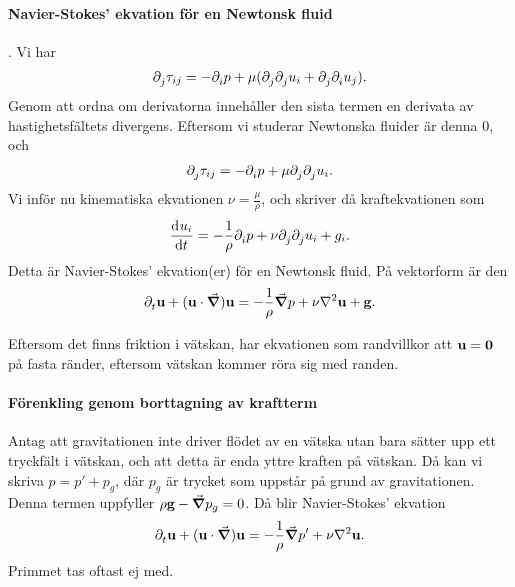 \paragraph{Navier-Stokes' ekvation för en Newtonsk fluid}.
Vi har
\begin{align*}
	\partial_{j}^{}\tau_{ij} = -\partial_{i}^{}p + \mu(\partial_{j}^{}\partial_{j}^{}u_{i} + \partial_{j}^{}\partial_{i}^{}u_{j}).
\end{align*}
Genom att ordna om derivatorna innehåller den sista termen en derivata av hastighetsfältets divergens. Eftersom vi studerar Newtonska fluider är denna $0$, och
\begin{align*}
	\partial_{j}^{}\tau_{ij} = -\partial_{i}^{}p + \mu\partial_{j}^{}\partial_{j}^{}u_{i}.
\end{align*}
Vi inför nu kinematiska ekvationen $\nu = \frac{\mu}{\rho}$, och skriver då kraftekvationen som
\begin{align*}
	\dv[]{u_{i}}{t} = -\frac{1}{\rho}\partial_{i}^{}p + \nu\partial_{j}^{}\partial_{j}^{}u_{i} + g_{i}.
\end{align*}
Detta är Navier-Stokes' ekvation(er) för en Newtonsk fluid. På vektorform är den
\begin{align*}
	\del{t}{\vb{u}} + (\vb{u}\cdot\grad)\vb{u} = -\frac{1}{\rho}\grad{p} + \nu\laplacian{\vb{u}} + \vb{g}.
\end{align*}

Eftersom det finns friktion i vätskan, har ekvationen som randvillkor att $\vb{u} = \vb{0}$ på fasta ränder, eftersom vätskan kommer röra sig med randen.

\paragraph{Förenkling genom borttagning av kraftterm}
Antag att gravitationen inte driver flödet av en vätska utan bara sätter upp ett tryckfält i vätskan, och att detta är enda yttre kraften på vätskan. Då kan vi skriva $p = p' + p_{g}$, där $p_{g}$ är trycket som uppstår på grund av gravitationen. Denna termen uppfyller $\rho\vb{g} - \grad{p_{g}} = 0$. Då blir Navier-Stokes' ekvation
\begin{align*}
	\del{t}{\vb{u}} + (\vb{u}\cdot\grad)\vb{u} = -\frac{1}{\rho}\grad{p'} + \nu\laplacian{\vb{u}}.
\end{align*}
Primmet tas oftast ej med.